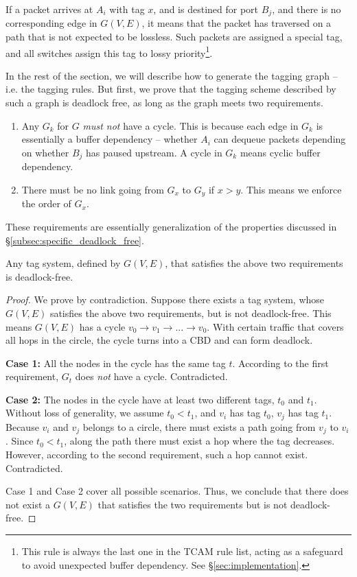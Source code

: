 If a packet arrives at $A_i$ with tag $x$, and is destined for port $B_j$, and
there is no corresponding edge in $G(V,E)$, it means that the packet has
traversed on a path that is not expected to be lossless.  Such packets are
assigned a special tag, and all switches assign this tag to lossy
priority\footnote{This rule is always the last one in the
TCAM rule list, acting as a safeguard to avoid unexpected buffer dependency.
See \S\ref{sec:implementation}.}.

In the rest of the section, we will describe how to generate the tagging graph
-- i.e. the tagging rules. But first, we prove that the tagging scheme described
by such a graph is deadlock free, as long as the graph meets two requirements.

\begin{enumerate}

		\item  Any $G_k$ for $G$ {\em must not} have a cycle.  This is
				because each edge in $G_k$ is essentially a buffer dependency --
				whether $A_i$ can dequeue packets depending on whether $B_j$ has
				paused upstream. A cycle in $G_k$ means cyclic buffer
				dependency.
		\item There must be no link going from
				$G_x$ to $G_y$ if $x>y$.  This means we enforce the order of
				$G_x$.
\end{enumerate}

These requirements are essentially generalization of the properties
discussed in \S\ref{subsec:specific_deadlock_free}.

\begin{theorem}
Any tag system, defined by $G(V,E)$, that satisfies the above two requirements is deadlock-free.
\end{theorem}

\begin{proof}
We prove by contradiction. Suppose there exists a tag system,
whose $G(V,E)$ satisfies the above two requirements, but is not deadlock-free. This means
$G(V,E)$ has a cycle $v_0 \rightarrow v_1 \rightarrow ... \rightarrow v_0$. With certain
traffic that covers all hops in the circle, the cycle turns into a CBD and can form deadlock.

\textbf{Case 1:} All the nodes in the cycle has the same tag $t$. According to
the first requirement, $G_t$ does {\em not} have a cycle. Contradicted.

\textbf{Case 2:} The nodes in the cycle have at least two different tags, $t_0$ and $t_1$.
Without loss of generality, we assume $t_0 < t_1$, and $v_i$ has tag $t_0$, $v_j$
has tag $t_1$. Because $v_i$ and $v_j$ belongs to a circle, there must exists
a path going from $v_j$ to $v_i$. Since $t_0 < t_1$, along the path there must exist
a hop where the tag decreases. However, according to the second requirement, such a hop
cannot exist. Contradicted.

Case 1 and Case 2 cover all possible scenarios. Thus, we conclude that there does not
exist a $G(V,E)$ that satisfies the two requirements but is not deadlock-free.
\end{proof}

